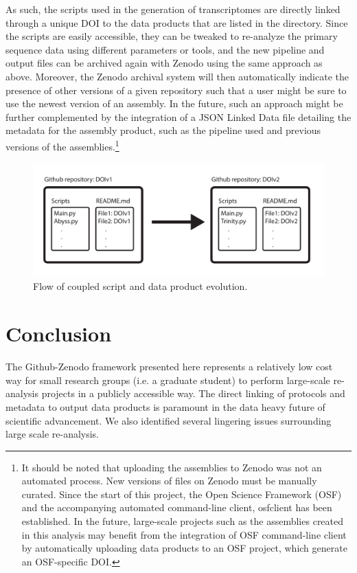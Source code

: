 \documentclass[a4paper,num-refs]{oup-contemporary}
\begin{document}
As such, the scripts used in the generation of transcriptomes are
directly linked through a unique DOI to the data products that are
listed in the directory. Since the scripts are easily accessible, they
can be tweaked to re-analyze the primary sequence data using different
parameters or tools, and the new pipeline and output files can be
archived again with Zenodo using the same approach as above.
Moreover, the Zenodo archival system will then automatically indicate
the presence of other versions of a given repository such that a user
might be sure to use the newest version of an assembly. In the future,
such an approach might be further complemented by the integration of a
JSON Linked Data file detailing the metadata for the assembly product,
such as the pipeline used and previous versions of the assemblies.\footnote{It should be noted that uploading the assemblies to Zenodo was not an automated process. New versions of files on Zenodo must be manually curated. Since the start of this project, the Open Science Framework (OSF) and the accompanying automated command-line client, osfclient has been established. In the future, large-scale projects such as the assemblies created in this analysis may benefit from the integration of OSF command-line client by automatically uploading data products to an OSF project, which generate an OSF-specific DOI.}

\begin{figure}
  \centering
  \includegraphics[width=\linewidth]{Diagram.pdf}
  \caption{Flow of coupled script and data product evolution.}
  \label{fig:FlowDiagram}
\end{figure}
\section{Conclusion}

The Github-Zenodo framework presented here represents a relatively low
cost way for small research groups (i.e. a graduate
student) to perform large-scale re-analysis projects in a publicly accessible way. The direct linking of protocols and
metadata to output data products is paramount in the data heavy future
of scientific advancement. We also identified several lingering issues surrounding large scale
re-analysis.
\end{document}
